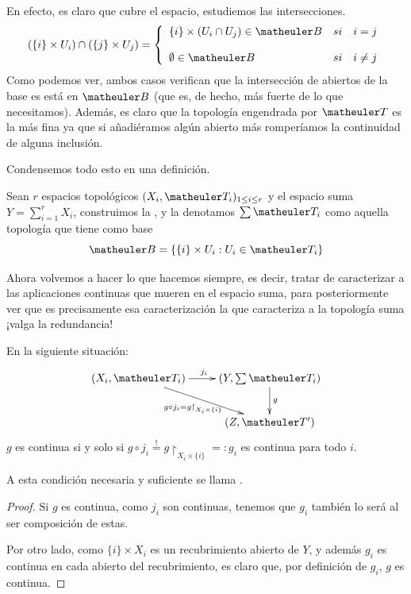 En efecto, es claro que cubre el espacio, estudiemos las intersecciones.
\begin{equation}
(\{i\}\times U_i)\cap(\{j\}\times U_j)=
\left\{ \begin{array}{lcc}
\{i\}\times(U_i\cap U_j)\in\B &   si  & i=j \\
\\  \emptyset\in\B& si & i\neq j 
\end{array}
\right.
\end{equation}
Como podemos ver, ambos casos verifican que la intersección de abiertos de la base es está en $\B$ (que es, de hecho, más fuerte de lo que necesitamos). Además, es claro que la topología engendrada por $\T$ es la más fina ya que si añadiéramos algún abierto más romperíamos la continuidad de alguna inclusión.

Condensemos todo esto en una definición.
\begin{defi}
	Sean $r$ espacios topológicos $(X_i, \T_i)_{1\le i \le r}$ y el espacio suma $Y=\sum_{i=1}^rX_i$, construimos la , y la denotamos $\sum\T_i$ como aquella topología que tiene como base \[\B=\{\{i\}\times U_i:U_i\in\T_i\}\]
\end{defi}

Ahora volvemos a hacer lo que hacemos siempre, es decir, tratar de caracterizar a las aplicaciones continuas que mueren en el espacio suma, para posteriormente ver que es precisamente esa caracterización la que caracteriza a la topología suma ¡valga la redundancia!

\begin{lem}
	En la siguiente situación:
	\[\xymatrix{
		(X_i,\T_i)\ar[r]^{j_i} \ar[rd]_{g\circ j_i = g\restriction_{X_i\times\{i\}}}& (Y,\sum\T_i)\ar[d]^{g}\\
		& (Z,\T')
	}\]
	$g$ es continua si y solo si $g\circ j_i\stackrel{!}{=}g\restriction_{X_i\times\{i\}}=:g_i$ es continua para todo $i$.
	
	A esta condición necesaria y suficiente se llama .
	\begin{proof}
		Si $g$ es continua, como $j_i$ son continuas, tenemos que $g_i$ también lo será al ser composición de estas.
		
		Por otro lado, como $\{i\}\times X_i$ es un recubrimiento abierto de $Y$, y además $g_i$ es continua en cada abierto del recubrimiento, es claro que, por definición de $g_i$, $g$ es continua.
	\end{proof}
\end{lem}

